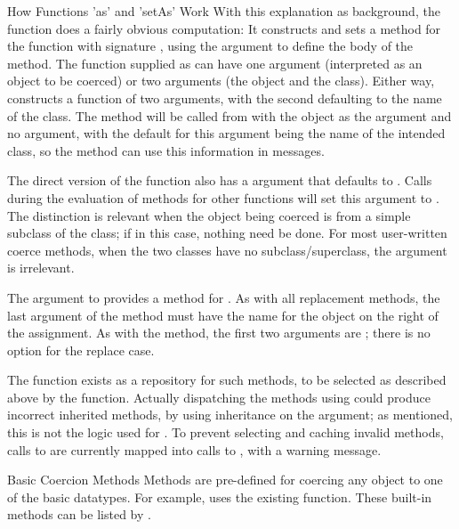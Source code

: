 \begin{Section}{How Functions 'as' and 'setAs' Work}
With this explanation as background, the function  does a
fairly obvious computation:  It constructs and sets a method for the function
 with signature , using the 
argument to define the body of the method.  The function supplied as
 can have one argument (interpreted as an object to be
coerced) or two arguments (the  object and the 
class).  Either way,  constructs a function of two
arguments, with the second defaulting to the name of the 
class.  The method will be called from  with the object
as the  argument and no  argument, with the default for this argument being the name of the intended
 class, so the method can use this information in messages.

The direct version of the  function also has a  argument that defaults to .
Calls during the evaluation of methods for other functions will set this argument to .
The distinction is relevant when the object being coerced is from a simple subclass of the  class; if  in this case, nothing need be done.
For most user-written coerce methods, when the two classes have no subclass/superclass, the  argument is irrelevant.

The  argument to  provides a method for
.
As with all replacement methods, the last argument of the method must
have the name  for the object on the right of the
assignment.
As with the  method, the first two arguments are
; there is no  option for the replace case.

The function  exists as a repository for
such methods, to be selected as described above by the 
function.  Actually dispatching the methods using
 could produce incorrect inherited methods, by using
inheritance on the
 argument; as mentioned, this is not the logic used for
.
To prevent selecting and caching invalid methods, calls to
 are
currently mapped into calls to , with a warning message.
\end{Section}
%
\begin{Section}{Basic Coercion Methods}
Methods are pre-defined for coercing any object to one of the basic
datatypes.  For example,  uses the existing
 function.  These built-in methods can be listed by
.
\end{Section}
